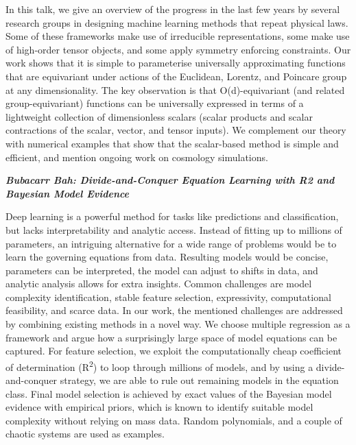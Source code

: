 In this talk, we give an overview of the progress in the last few years
by several research groups in designing machine learning methods that
repeat physical laws. Some of these frameworks make use of irreducible
representations, some make use of high-order tensor objects, and some
apply symmetry enforcing constraints. Our work shows that it is simple
to parameterise universally approximating functions that are equivariant
under actions of the Euclidean, Lorentz, and Poincare group at any
dimensionality. The key observation is that O(d)-equivariant (and
related group-equivariant) functions can be universally expressed in
terms of a lightweight collection of dimensionless scalars (scalar
products and scalar contractions of the scalar, vector, and tensor
inputs). We complement our theory with numerical examples that show that
the scalar-based method is simple and efficient, and mention ongoing
work on cosmology simulations.~

\emph{\textbf{Bubacarr Bah: Divide-and-Conquer Equation Learning with R2
and Bayesian Model Evidence}}

Deep learning is a powerful method for tasks like predictions and
classification, but lacks interpretability and analytic access. Instead
of fitting up to millions of parameters, an intriguing alternative for a
wide range of problems would be to learn the governing equations from
data. Resulting models would be concise, parameters can be interpreted,
the model can adjust to shifts in data, and analytic analysis allows for
extra insights. Common challenges are model complexity identification,
stable feature selection, expressivity, computational feasibility, and
scarce data. In our work, the mentioned challenges are addressed by
combining existing methods in a novel way. We choose multiple regression
as a framework and argue how a surprisingly large space of model
equations can be captured. For feature selection, we exploit the
computationally cheap coefficient of determination
(R\textsuperscript{2}) to loop through millions of models, and by using
a divide-and-conquer strategy, we are able to rule out remaining models
in the equation class. Final model selection is achieved by exact values
of the Bayesian model evidence with empirical priors, which is known to
identify suitable model complexity without relying on mass data. Random
polynomials, and a couple of chaotic systems are used as examples.

